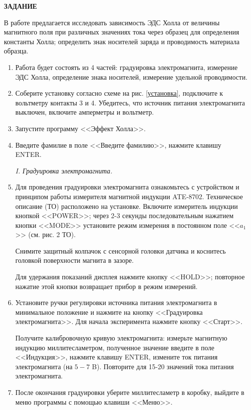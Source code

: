 \documentclass[a4paper,12pt]{article} %
\begin{document}
\begin{center}
\textsf{\textbf{ЗАДАНИЕ}}
\end{center}
В работе предлагается исследовать зависимость ЭДС Холла от величины магнитного поля при различных значениях тока через образец для
определения константы Холла; определить знак носителей заряда и проводимость материала образца.


\begin{enumerate} 
	\item Работа будет состоять из 4 частей: градуировка электромагнита, измерение ЭДС Холла, определение знака носителей, измерение удельной проводимости.
  \item Соберите установку согласно схеме на рис. \ref{установка}, подключите к вольтметру контакты 3 и 4. Убедитесь, что источник питания электромагнита выключен, включите амперметры и вольтметр.
  \item Запустите программу <<Эффект Холла>>.
  \item Введите фамилие в поле <<Введите фамилию>>, нажмите клавишу ENTER.
  
\begin{center}
\textit{I. Градуировка электромагнита.}
\end{center}
  
  \item Для проведения градуировки электромагнита ознакомьтесь с устройством и принципом работы измерителя магнитной индукции ATE-8702. Техническое описание (ТО) расположено на установке.
  Включите измеритель индукции кнопкой <<POWER>>; через 2-3 секунды последовательным нажатием кнопки <<MODE>> установите режим измерения в постоянном поле  <<$a_1$>> (см. рис. 2 ТО).
  
  Снимите защитный колпачок с сенсорной головки датчика и коснитесь головкой поверхности магнита в зазоре.
  
  Для удержания показаний дисплея нажмите кнопку <<HOLD>>; повторное нажатие этой кнопки возвращает прибор в режим измерений.
  
  \item Установите ручки регулировки источника питания электромагнита в минимальное положение и нажмите на кнопку <<Градуировка электромагнита>>. Для начала эксперимента нажмите кнопку  <<Старт>>.
  
   Получите калибровочную кривую электромагнита: измерьте магнитную индукцию миллитесламетром, полученное значение введите в поле  <<Индукция>>, нажмите клавишу ENTER, измените ток питания электромагнита (на $5-7$ B). Повторите для 15-20 значений тока питания электромагнита.
   \item После окончания градуировки уберите миллитесламетр в коробку, выйдите в меню программы с помощью клавиши <<Меню>>.
   

\end{enumerate}
\end{document}
